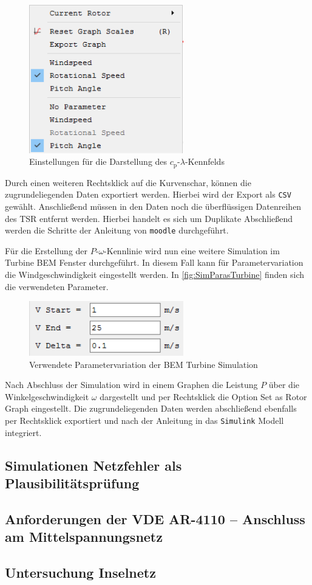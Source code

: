 \begin{figure}[H]
    \centering
    \includegraphics[width=0.6\textwidth]{Bilder/QBlade_CharBEM_GraphParas}
    \caption{Einstellungen für die Darstellung des $c_\text{p}$-$\lambda$-Kennfelds}\label{fig:GraphParas}
\end{figure}

Durch einen weiteren Rechtsklick auf die Kurvenschar, können die zugrundeliegenden Daten exportiert werden. Hierbei wird der Export als \texttt{CSV} gewählt. Anschließend müssen in den Daten noch die überflüssigen Datenreihen des \gls{TSR} entfernt werden. Hierbei handelt es sich um Duplikate Abschließend werden die Schritte der Anleitung von \texttt{moodle} durchgeführt.\medskip

Für die Erstellung der $P$-$\omega$-Kennlinie wird nun eine weitere Simulation im \glqq Turbine \gls{BEM}\grqq{} Fenster durchgeführt. In diesem Fall kann für Parametervariation die Windgeschwindigkeit eingestellt werden. In \autoref{fig:SimParasTurbine} finden sich die verwendeten Parameter.

\begin{figure}[H]
    \centering
    \includegraphics[width=0.6\textwidth]{Bilder/QBlade_TurbineBEM_SimParas}
    \caption{Verwendete Parametervariation der BEM Turbine Simulation}\label{fig:SimParasTurbine}
\end{figure}

Nach Abschluss der Simulation wird in einem Graphen die Leistung $P$ über die Winkelgeschwindigkeit $\omega$ dargestellt und per Rechtsklick die Option \glqq Set as Rotor Graph\grqq{} eingestellt. Die zugrundeliegenden Daten werden abschließend ebenfalls per Rechtsklick exportiert und nach der Anleitung in das \texttt{Simulink} Modell integriert.

\subsection{Simulationen Netzfehler als Plausibilitätsprüfung}

\subsection{Anforderungen der VDE AR-4110 {--} Anschluss am Mittelspannungsnetz}

\subsection{Untersuchung Inselnetz}